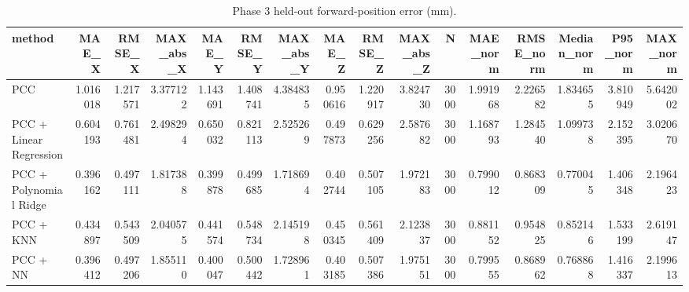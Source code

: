 \begin{table}
\caption{Phase 3 held-out forward-position error (mm).}
\label{tab:phase3_extended}
\begin{tabular}{lrrrrrrrrrrrrrrr}
\toprule
method & MAE_X & RMSE_X & MAX_abs_X & MAE_Y & RMSE_Y & MAX_abs_Y & MAE_Z & RMSE_Z & MAX_abs_Z & N & MAE_norm & RMSE_norm & Median_norm & P95_norm & MAX_norm \\
\midrule
PCC & 1.016018 & 1.217571 & 3.377122 & 1.143691 & 1.408741 & 4.384835 & 0.950616 & 1.220917 & 3.824730 & 3000 & 1.991968 & 2.226582 & 1.834655 & 3.810949 & 5.642002 \\
PCC + Linear Regression & 0.604193 & 0.761481 & 2.498294 & 0.650032 & 0.821113 & 2.525269 & 0.497873 & 0.629256 & 2.587682 & 3000 & 1.168793 & 1.284540 & 1.099738 & 2.152395 & 3.020670 \\
PCC + Polynomial Ridge & 0.396162 & 0.497111 & 1.817388 & 0.399878 & 0.499685 & 1.718694 & 0.402744 & 0.507105 & 1.972183 & 3000 & 0.799012 & 0.868309 & 0.770045 & 1.406348 & 2.196423 \\
PCC + KNN & 0.434897 & 0.543509 & 2.040575 & 0.441574 & 0.548734 & 2.145198 & 0.450345 & 0.561409 & 2.123837 & 3000 & 0.881152 & 0.954825 & 0.852146 & 1.533199 & 2.619147 \\
PCC + NN & 0.396412 & 0.497206 & 1.855110 & 0.400047 & 0.500442 & 1.728961 & 0.403185 & 0.507386 & 1.975151 & 3000 & 0.799555 & 0.868962 & 0.768868 & 1.416337 & 2.199613 \\
\bottomrule
\end{tabular}
\end{table}
